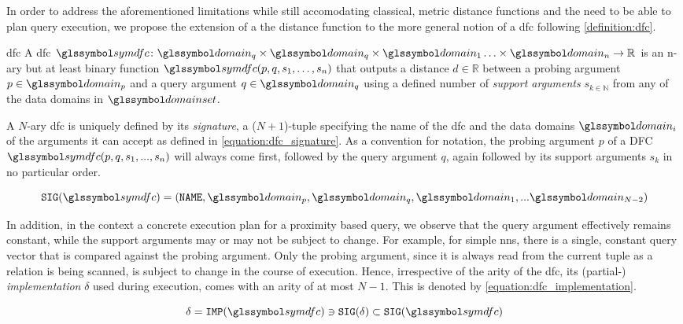 In order to address the aforementioned limitations while still accomodating classical, metric distance functions and the need to be able to plan query execution, we propose the extension of a the distance function to the more general notion of a \acrfull{dfc} following \cref{definition:dfc}.

\begin{definition}[label=definition:dfc]{\acrlong{dfc}}{}
    A \acrshort{dfc} $\symdfc \colon \domain_q \times \domain_q \times \domain_{1} \ldots \times \domain_{n} \to \mathbb{R}$ is an n-ary but at least binary function $\symdfc(p,q,s_1,\ldots,s_n)$ that outputs a distance $d \in \mathbb{R}$ between a probing argument $p \in \domain_p$ and a query argument $q \in \domain_q$ using a defined number of \emph{support arguments} $s_{k \in \mathbb{N}}$ from any of the data domains in $\domainset$.
\end{definition}

A $N$-ary \acrshort{dfc} is uniquely defined by its \emph{signature}, a ($N+1$)-tuple specifying the name of the \acrshort{dfc} and the data domains $\domain_i$ of the arguments it can accept as defined in \cref{equation:dfc_signature}. As a convention for notation, the probing argument $p$ of a DFC $\symdfc(p,q,s_1,...,s_n)$ will always come first, followed by the query argument $q$, again followed by its support arguments $s_k$ in no particular order.

\begin{equation}
    \label{equation:dfc_signature}
    \texttt{SIG}(\symdfc) = (\mathtt{NAME}, \domain_p, \domain_q, \domain_1,... \domain_{N-2})
\end{equation}

In addition, in the context a concrete execution plan for a proximity based query, we observe that the query argument effectively remains constant, while the support arguments may or may not be subject to change. For example, for simple \acrshort{nns}, there is a single, constant query vector that is compared against the probing argument. Only the probing argument, since it is always read from the current tuple as a relation is being scanned, is subject to change in the course of execution. Hence, irrespective of the arity of the \acrshort{dfc}, its (partial-) \emph{implementation} $\delta$ used during execution, comes with an arity of at most $N-1$. This is denoted by \cref{equation:dfc_implementation}.

\begin{equation}
    \label{equation:dfc_implementation}
    \delta = \texttt{IMP}(\symdfc) \ni \texttt{SIG}(\delta) \subset \texttt{SIG}(\symdfc)
\end{equation}

